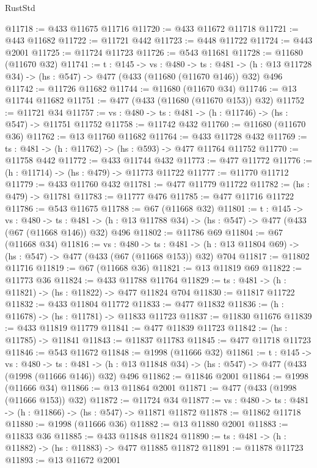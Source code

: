\begin{lexlean}{RustStd}
\begin{coremodule}
@11718 := @433 @11675 @11716
@11720 := @433 @11672 @11718
@11721 := @443 @11682
@11722 := @11721 @442
@11723 := @448 @11722
@11724 := @443 @2001
@11725 := @11724 @11723
@11726 := @543 @11681
@11728 := @11680 (@11670 @32)
@11741 := {t : @145} ->
  {vs : @480} ->
  {ts : @481} -> (h : @13 @11728 @34) -> (hs : @547) -> @477 (@433 (@11680 (@11670 @146)) @32) @496
@11742 := @11726 @11682
@11744 := @11680 (@11670 @34)
@11746 := @13 @11744 @11682
@11751 := @477 (@433 (@11680 (@11670 @153)) @32)
@11752 := @11721 @34
@11757 := {vs : @480} -> {ts : @481} -> (h : @11746) -> (hs : @547) -> @11751 @11752
@11758 := @11742 @432
@11760 := @11680 (@11670 @36)
@11762 := @13 @11760 @11682
@11764 := @433 @11728 @432
@11769 := {ts : @481} -> (h : @11762) -> (hs : @593) -> @477 @11764 @11752
@11770 := @11758 @442
@11772 := @433 @11744 @432
@11773 := @477 @11772
@11776 := (h : @11714) -> (hs : @479) -> @11773 @11722
@11777 := @11770 @11712
@11779 := @433 @11760 @432
@11781 := @477 @11779 @11722
@11782 := (hs : @479) -> @11781
@11783 := @11777 @476
@11785 := @477 @11716 @11722
@11786 := @543 @11675
@11788 := @67 (@11668 @32)
@11801 := {t : @145} ->
  {vs : @480} ->
  {ts : @481} -> (h : @13 @11788 @34) -> (hs : @547) -> @477 (@433 (@67 (@11668 @146)) @32) @496
@11802 := @11786 @69
@11804 := @67 (@11668 @34)
@11816 := {vs : @480} ->
  {ts : @481} -> (h : @13 @11804 @69) -> (hs : @547) -> @477 (@433 (@67 (@11668 @153)) @32) @704
@11817 := @11802 @11716
@11819 := @67 (@11668 @36)
@11821 := @13 @11819 @69
@11822 := @11773 @36
@11824 := @433 @11788 @11764
@11829 := {ts : @481} -> (h : @11821) -> (hs : @11822) -> @477 @11824 @704
@11830 := @11817 @11722
@11832 := @433 @11804 @11772
@11833 := @477 @11832
@11836 := (h : @11678) -> (hs : @11781) -> @11833 @11723
@11837 := @11830 @11676
@11839 := @433 @11819 @11779
@11841 := @477 @11839 @11723
@11842 := (hs : @11785) -> @11841
@11843 := @11837 @11783
@11845 := @477 @11718 @11723
@11846 := @543 @11672
@11848 := @1998 (@11666 @32)
@11861 := {t : @145} ->
  {vs : @480} ->
  {ts : @481} -> (h : @13 @11848 @34) -> (hs : @547) -> @477 (@433 (@1998 (@11666 @146)) @32) @496
@11862 := @11846 @2001
@11864 := @1998 (@11666 @34)
@11866 := @13 @11864 @2001
@11871 := @477 (@433 (@1998 (@11666 @153)) @32)
@11872 := @11724 @34
@11877 := {vs : @480} -> {ts : @481} -> (h : @11866) -> (hs : @547) -> @11871 @11872
@11878 := @11862 @11718
@11880 := @1998 (@11666 @36)
@11882 := @13 @11880 @2001
@11883 := @11833 @36
@11885 := @433 @11848 @11824
@11890 := {ts : @481} -> (h : @11882) -> (hs : @11883) -> @477 @11885 @11872
@11891 := @11878 @11723
@11893 := @13 @11672 @2001

\end{coremodule}
\end{lexlean}
